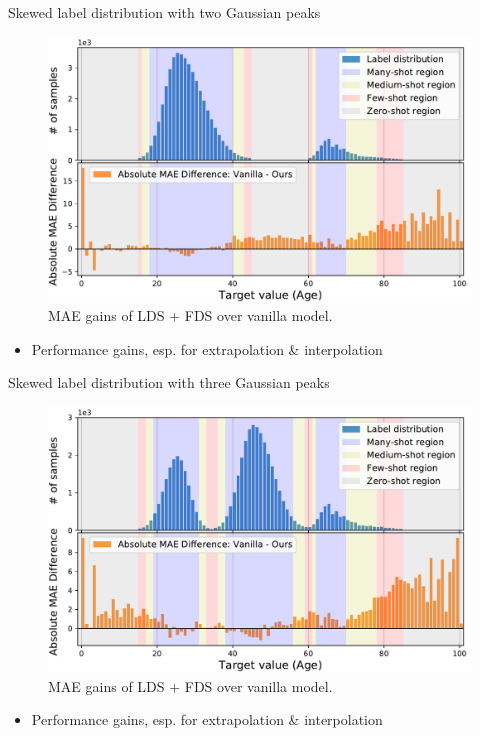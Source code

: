\begin{frame}{Skewed label distribution with two Gaussian peaks}
	\begin{figure}[h]
		\includegraphics[width=0.7\linewidth]{images/interp_extrap_diff_peak2.pdf}
		\caption{MAE gains of LDS + FDS over vanilla model.}
	\end{figure}
	\begin{itemize}
		\item Performance gains, esp. for extrapolation \& interpolation
	\end{itemize}
\end{frame}

\begin{frame}{Skewed label distribution with three Gaussian peaks}
	\begin{figure}[h]
		\includegraphics[width=0.7\linewidth]{images/interp_extrap_diff_peak3.pdf}
		\caption{MAE gains of LDS + FDS over vanilla model.}
	\end{figure}
	\begin{itemize}
		\item Performance gains, esp. for extrapolation \& interpolation
	\end{itemize}
\end{frame}

